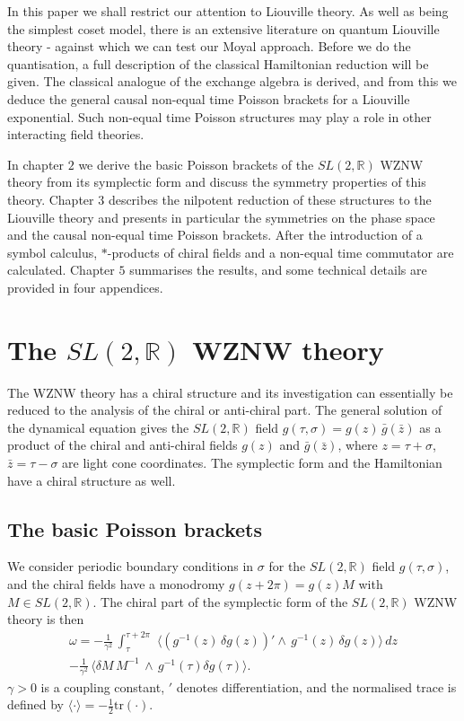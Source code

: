 \documentclass[a4paper,12pt]{article}
\newcommand{\rr}{\mathbb{R}}
\begin{document}
\noindent
In this paper we shall restrict our attention to Liouville theory.  As
well as being the simplest coset model, there is an extensive
literature on quantum Liouville theory \cite{Thorn}-\cite{OW} against
which we can test our Moyal approach.  Before we do the quantisation,
a full description of the classical Hamiltonian reduction will be
given.  The classical analogue of the exchange algebra is derived, and
from this we deduce the general causal non-equal time Poisson brackets
for a Liouville exponential. Such non-equal time Poisson structures
may play a role in other interacting field theories.

\noindent
In chapter $2$ we derive the basic Poisson brackets of the $SL(2,\rr)$
WZNW theory from its symplectic form and discuss the symmetry
properties of this theory. Chapter $3$ describes the nilpotent
reduction of these structures to the Liouville theory and presents in
particular the symmetries on the phase space and the causal non-equal
time Poisson brackets. After the introduction of a symbol calculus,
$*$-products of chiral fields and a non-equal time commutator are
calculated. Chapter $5$ summarises the results, and
some technical details are provided in four appendices.


\setcounter{equation}{0}
\section{The $SL(2,\rr)$ WZNW theory}

\noindent
The WZNW theory has a chiral structure and its investigation can
essentially be reduced to the analysis of the chiral or anti-chiral
part. The general solution of the dynamical equation gives the
$SL(2,\rr)$ field $g(\tau,\sigma)= g(z) \, \bar g(\bar z)$ as a product
of the chiral and anti-chiral fields $g(z)$ and $\bar g(\bar z)$,
 where $z=\tau +\sigma$, $\bar z=\tau -\sigma$ are
light cone coordinates. The symplectic form and the Hamiltonian have a
chiral structure as well.

\subsection{The basic Poisson brackets}

\noindent
We consider periodic boundary conditions in
$\sigma$ for the $SL(2,\rr)$ field $g(\tau,\sigma)$, and the chiral fields
have a monodromy $g(z+2\pi)=g(z)M$ with $M\in SL(2,\rr)$.  The
chiral part of the symplectic form of the $SL(2,\rr)$ WZNW theory
 is then \cite{Goddard, Gawedzki}
\begin{eqnarray}\label{omega-WZ}
\omega =-\frac{1}{\gamma^2}\,
\int_\tau^{\tau +2\pi}\,\, \langle(g^{-1}(z)\,\delta g(z))'\wedge\,
g^{-1}(z)\,\delta g(z)\rangle\,dz\\ \nonumber
-\frac{1}{\gamma^2}\,
\langle\delta M\, M^{-1}\, \wedge\, g^{-1}(\tau)\delta g(\tau)\rangle.
\end{eqnarray}
$\gamma >0$ is a coupling constant, $'$ denotes differentiation,
and the normalised trace is defined by $\langle
\cdot\rangle=-\frac{1}{2}\mbox{tr} (\cdot )$.
\end{document}
